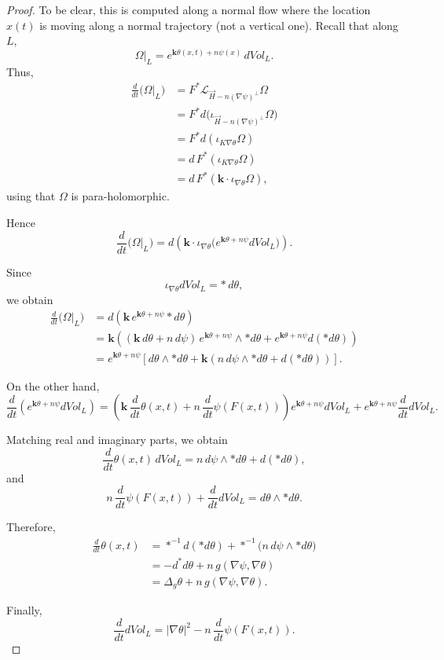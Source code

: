 \documentclass[12pt,letterpaper]{amsart}%
\numberwithin{mycounter}{section}
\theoremstyle{plain}
\numberwithin{equation}{section}
\theoremstyle{definition}
\begin{document}
\begin{proof}
To be clear, this is computed along a normal flow where the location $x(t)$ is moving along a normal trajectory (not a vertical one). Recall that along $L$,
\[
\Omega|_L = e^{\mathbf{k}\theta(x,t) + n\psi(x)} \, dVol_L .
\]
Thus,
\begin{align*}
\frac{d}{dt}\big(\Omega|_L\big)
    &= F^* \mathcal{L}_{\vec{H}-n(\nabla\psi)^\perp}\Omega  \\
    &= F^* d\big( \iota_{\vec{H}-n(\nabla\psi)^\perp}\Omega \big) \\
    &= F^* d(\iota_{K\nabla\theta} \Omega)  \\
    &= d\, F^*(\iota_{K\nabla\theta}\Omega)  \\
    &= d\, F^*(\mathbf{k}\cdot \iota_{\nabla\theta}\Omega),
\end{align*}
using that $\Omega$ is para-holomorphic.

Hence
\[
\frac{d}{dt}\big(\Omega|_L\big)
    = d\!\left( \mathbf{k}\cdot \iota_{\nabla\theta}
        \big(e^{\mathbf{k}\theta+n\psi} dVol_L\big) \right).
\]

Since
\[
\iota_{\nabla\theta} dVol_L = *\, d\theta ,
\]
we obtain
\begin{align*}
\frac{d}{dt}\big(\Omega|_L\big)
    &= d\!\left( \mathbf{k}\, e^{\mathbf{k}\theta+n\psi} *d\theta \right) \\
    &= \mathbf{k}\left( (\mathbf{k}\, d\theta + n\, d\psi)\,
         e^{\mathbf{k}\theta+n\psi} \wedge *d\theta
         + e^{\mathbf{k}\theta+n\psi} d(*d\theta) \right) \\
    &= e^{\mathbf{k}\theta+n\psi}
       \left[ d\theta\wedge *d\theta
              + \mathbf{k}\left( n\, d\psi\wedge *d\theta + d(*d\theta) \right)
       \right].
\end{align*}

On the other hand,
\[
\frac{d}{dt}\left(e^{\mathbf{k}\theta+n\psi} dVol_L\right)
    = \left(\mathbf{k}\,\frac{d}{dt}\theta(x,t)
            + n\,\frac{d}{dt}\psi(F(x,t))\right)
        e^{\mathbf{k}\theta+n\psi} dVol_L
        + e^{\mathbf{k}\theta+n\psi} \frac{d}{dt} dVol_L.
\]

Matching real and imaginary parts, we obtain
\[
\frac{d}{dt}\theta(x,t)\, dVol_L
    = n\, d\psi\wedge *d\theta + d(*d\theta),
\]
and
\[
n\,\frac{d}{dt}\psi(F(x,t)) + \frac{d}{dt} dVol_L
    = d\theta\wedge *d\theta.
\]

Therefore,
\begin{align*}
\frac{d}{dt}\theta(x,t)
    &= *^{-1} d(*d\theta) + *^{-1}\big(n\, d\psi\wedge *d\theta\big) \\
    &= - d^* d\theta + n\, g(\nabla\psi,\nabla\theta) \\
    &= \Delta_g \theta + n\, g(\nabla\psi,\nabla\theta).
\end{align*}

Finally,
\[
\frac{d}{dt} dVol_L 
    = |\nabla\theta|^2 - n\,\frac{d}{dt}\psi(F(x,t)).
\]

\end{proof}
\end{document}
